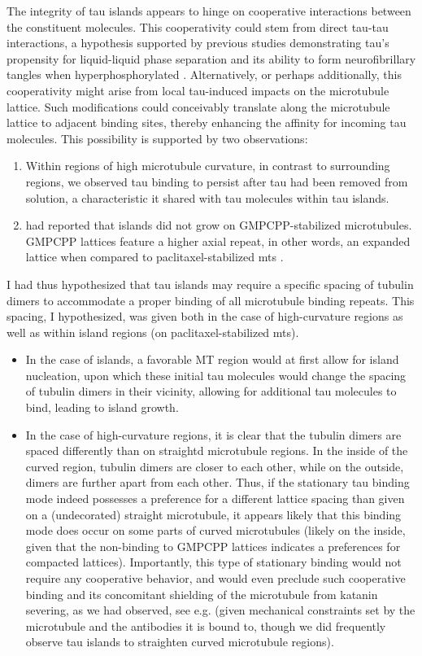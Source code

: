 The integrity of tau islands appears to hinge on cooperative interactions between the constituent molecules. This cooperativity could stem from direct tau-tau interactions, a hypothesis supported by previous studies demonstrating tau's propensity for liquid-liquid phase separation \parencite{HERNANDEZVEGA20172304} and its ability to form neurofibrillary tangles when hyperphosphorylated \parencite{iqbal2016tau}. Alternatively, or perhaps additionally, this cooperativity might arise from local tau-induced impacts on the microtubule lattice. Such modifications could conceivably translate along the microtubule lattice to adjacent binding sites, thereby enhancing the affinity for incoming tau molecules. This possibility is supported by two observations: 
\begin{enumerate}
    \item Within regions of high microtubule curvature, in contrast to surrounding regions, we observed tau binding to persist after tau had been removed from solution, a characteristic it shared with tau molecules within tau islands.
    \item \cite{tan2019microtubules} had reported that islands did not grow on GMPCPP-stabilized microtubules. GMPCPP lattices feature a higher axial repeat, in other words, an expanded lattice when compared to paclitaxel-stabilized mts .
\end{enumerate}
I had thus hypothesized that tau islands may require a specific spacing of tubulin dimers to accommodate a proper binding of all microtubule binding repeats. This spacing, I hypothesized, was given both in the case of high-curvature regions as well as within island regions (on paclitaxel-stabilized mts). 
\begin{itemize}
    \item In the case of islands, a favorable MT region would at first allow for island nucleation, upon which these initial tau molecules would change the spacing of tubulin dimers in their vicinity, allowing for additional tau molecules to bind, leading to island growth.
    \item  In the case of high-curvature regions, it is clear that the tubulin dimers are spaced differently than on straightd microtubule regions. In the inside of the curved region, tubulin dimers are closer to each other, while on the outside, dimers are further apart from each other. Thus, if the stationary tau binding mode indeed possesses a preference for a different lattice spacing than given on a (undecorated) straight microtubule, it appears likely that this binding mode does occur on some parts of curved microtubules (likely on the inside, given that the non-binding to GMPCPP lattices indicates a preferences for compacted lattices). Importantly, this type of stationary binding would not require any cooperative behavior, and would even preclude such cooperative binding and its concomitant shielding of the microtubule from katanin severing, as we had observed, see e.g.  (given mechanical constraints set by the microtubule and the antibodies it is bound to, though we did frequently observe tau islands to straighten curved microtubule regions). 
\end{itemize}
